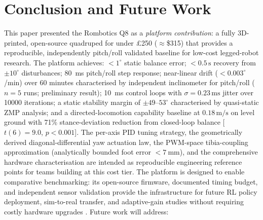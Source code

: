 \documentclass[journal]{IEEEtran}
\newcommand{\dg}{^{\circ}}
\begin{document}
\section{Conclusion and Future Work}
\label{sec:conc}
This paper presented the Rombotics Q8 as a \emph{platform
contribution}: a fully 3D-printed, open-source quadruped for
under \pounds250 ($\approx$\$315) that provides a reproducible,
independently pitch/roll validated baseline for low-cost
legged-robot research.
The platform achieves: $<1\dg$ static balance error;
$<0.5\,\text{s}$ recovery from $\pm10\dg$ disturbances;
\SI{80}{\milli\second} pitch/roll step response;
near-linear drift ($<0.003\dg$/min) over 60 minutes
characterised by independent inclinometer for pitch/roll
($n=5$ runs; preliminary result);
\SI{10}{\milli\second} control loops with $\sigma=0.23\,\text{ms}$
jitter over \num{10000} iterations;
a static stability margin of $\pm49$--$53\dg$ characterised by
quasi-static ZMP analysis; and a directed-locomotion capability
baseline at $0.18\,\text{m/s}$ on level ground with 71\%
stance-deviation reduction from closed-loop balance
[$t(6){=}9.0$, $p{<}0.001$].
The per-axis PID tuning strategy, the geometrically derived
diagonal-differential yaw actuation law, the PWM-space
tibia-coupling approximation (analytically bounded foot error
$<\SI{7}{\milli\metre}$), and the comprehensive hardware
characterisation are intended as reproducible engineering
reference points for teams building at this cost tier.
The platform is designed to enable comparative benchmarking:
its open-source firmware, documented timing budget, and
independent sensor validation provide the infrastructure
for future RL policy deployment, sim-to-real transfer,
and adaptive-gain studies without requiring costly hardware upgrades
\cite{bellicoso2018advances}.
\noindent Future work will address:
\end{document}
